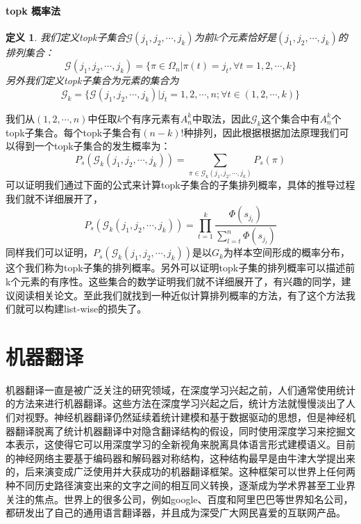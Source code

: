 \documentclass[twoside,a4paper,12pt]{book}%
\newtheorem{definition}{定义}
\begin{document}
\subsubsection{topk 概率法}
\begin{definition}
我们定义topk子集合$\mathcal{G}(j_1,j_2,\cdots,j_k)$为前k个元素恰好是$(j_1,j_2,\cdots,j_k)$的排列集合：
$$
\mathcal{G}(j_1,j_2,\cdots,j_k)=\{\pi \in \Omega_n|\pi(t)=j_t, \forall t=1,2,\cdots,k\}
$$
另外我们定义topk子集合为元素的集合为
$$
\mathcal{G}_k=\{ \mathcal{G}(j_1,j_2,\cdots,j_k)|  j_t = 1,2,\cdots,n; \forall t\in (1,2,\cdots,k) \}
$$
\end{definition}
我们从$(1,2,\cdots,n)$中任取$k$个有序元素有$A_{n}^{k}$中取法，因此$\mathcal{G}_k$这个集合中有$A_{n}^{k}$个topk子集合。每个topk子集合有$(n-k)!$种排列，因此根据根据加法原理我们可以得到一个topk子集合的发生概率为：
$$
P_s(\mathcal{G}_k(j_1,j_2,\cdots,j_k))=\sum_{\pi \in \mathcal{G}_k(j_1,j_2,\cdots,j_k)}{P_s(\pi)}
$$
可以证明我们通过下面的公式来计算topk子集合的子集排列概率，具体的推导过程我们就不详细展开了，
$$
P_s(\mathcal{G}_k(j_1,j_2,\cdots,j_k))
=\prod_{t=1}^{k}{
\frac{\Phi(s_{j_t})}{
                        \sum_{l=t}^n{\Phi(s_{j_l})}
                    }
}
$$
同样我们可以证明，$P_s(\mathcal{G}_k(j_1,j_2,\cdots,j_k))$是以$G_k$为样本空间形成的概率分布，这个我们称为topk子集的排列概率。另外可以证明topk子集的排列概率可以描述前k个元素的有序性。这些集合的数学证明我们就不详细展开了，有兴趣的同学，建议阅读相关论文。至此我们就找到一种近似计算排列概率的方法，有了这个方法我们就可以构建list-wise的损失了。

\chapter{机器翻译}
机器翻译一直是被广泛关注的研究领域，在深度学习兴起之前，人们通常使用统计的方法来进行机器翻译。这些方法在深度学习兴起之后，统计方法就慢慢淡出了人们对视野。神经机器翻译仍然延续着统计建模和基于数据驱动的思想，但是神经机器翻译脱离了统计机器翻译中对隐含翻译结构的假设，同时使用深度学习来挖掘文本表示，这使得它可以用深度学习的全新视角来脱离具体语言形式建模语义。目前的神经网络主要基于编码器和解码器对称结构，这种结构最早是由牛津大学提出来的，后来演变成广泛使用并大获成功的机器翻译框架。这种框架可以世界上任何两种不同历史路径演变出来的文字之间的相互同义转换，逐渐成为学术界甚至工业界关注的焦点。世界上的很多公司，例如google、百度和阿里巴巴等世界知名公司，都研发出了自己的通用语言翻译器，并且成为深受广大网民喜爱的互联网产品。
\end{document}
